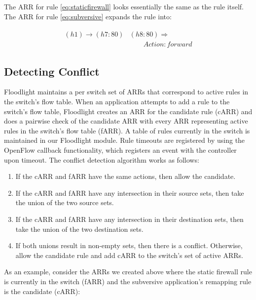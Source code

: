 The ARR for rule \ref{eq:staticfirewall} looks essentially the same as the rule itself.
The ARR for rule \ref{eq:subversive} expands the rule into:

\begin{align}
\begin{aligned}
(h1) \rightarrow (h7:80)&(h8:80) \Rightarrow \\ 
     &\qquad Action: forward \nonumber
\end{aligned}
\end{align}

\subsection{Detecting Conflict}
\label{subsec:conflict}
Floodlight maintains a per switch set of ARRs that correspond to active rules in the switch's flow table.
When an application attempts to add a rule to the switch's flow table, Floodlight creates an ARR for the candidate rule (cARR) and does a pairwise check of the candidate ARR with every ARR representing active rules in the switch's flow table (fARR). A table of rules currently in the switch is maintained in our Floodlight module. Rule timeouts are registered by using the OpenFlow callback functionality, which registers an event with the controller upon timeout. %
The conflict detection algorithm works as follows:
\begin{enumerate}
\item If the cARR and fARR have the same actions, then allow the candidate.
\item If the cARR and fARR have any intersection in their source sets, then take the union of the two source sets.
\item If the cARR and fARR have any intersection in their destination sets, then take the union of the two destination sets.
\item If both unions result in non-empty sets, then there is a conflict. Otherwise, allow the candidate rule and add cARR to the switch's set of active ARRs.
\end{enumerate} 

As an example, consider the ARRs we created above where the static firewall rule is currently in the switch (fARR) and the subversive application's remapping rule is the candidate (cARR):

